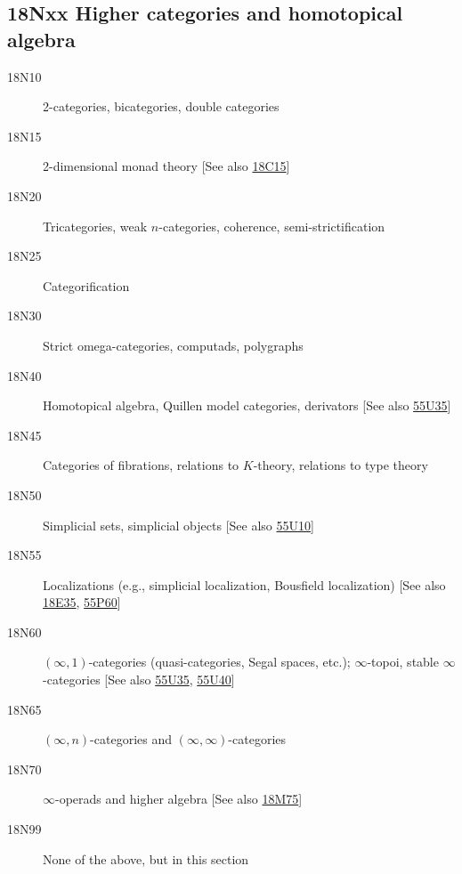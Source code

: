 \documentclass[letterpaper]{article}
\begin{document}
\subsection*{18Nxx Higher categories and homotopical algebra}\label{18Nxx}
\begin{description} 
\item [18N10]\label{18N10} 2-categories, bicategories, double categories
\item [18N15]\label{18N15} 2-dimensional monad theory [See also \hyperref[18C15]{18C15}]
\item [18N20]\label{18N20} Tricategories, weak $n$-categories, coherence, semi-strictification
\item [18N25]\label{18N25} Categorification
\item [18N30]\label{18N30} Strict omega-categories, computads, polygraphs
\item [18N40]\label{18N40} Homotopical algebra, Quillen model categories, derivators [See also \hyperref[55U35]{55U35}]
\item [18N45]\label{18N45} Categories of fibrations, relations to $K$-theory, relations to type theory
\item [18N50]\label{18N50} Simplicial sets, simplicial objects [See also \hyperref[55U10]{55U10}]
\item [18N55]\label{18N55} Localizations (e.g., simplicial localization, Bousfield localization) [See also \hyperref[18E35]{18E35}, \hyperref[55P60]{55P60}]
\item [18N60]\label{18N60} $(\infty,1)$-categories (quasi-categories, Segal spaces, etc.); $\infty$-topoi, stable $\infty$-categories [See also \hyperref[55U35]{55U35}, \hyperref[55U40]{55U40}]
\item [18N65]\label{18N65} $(\infty, n)$-categories and $(\infty,\infty)$-categories
\item [18N70]\label{18N70} $\infty$-operads and higher algebra [See also \hyperref[18M75]{18M75}]
\item [18N99]\label{18N99} None of the above, but in this section
\end{description}
\end{document}
